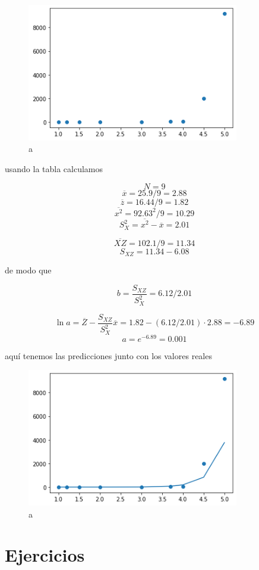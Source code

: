 \documentclass[]{book}
\theoremstyle{plain}
\theoremstyle{definition}
\begin{document}
\begin{figure}
\centering
\includegraphics[width=3.64583in,height=\textheight]{img/exponential_regression.png}
\caption{a}
\end{figure}

usando la tabla calculamos

\[N=9\] \[\overline{x} = 25.9/9 = 2.88\]
\[\overline{z} = 16.44/9 = 1.82\] \[\overline{x^2}=92.63^2/9 = 10.29\]
\[S^2_X=\overline{x^2} - \overline{x} = 2.01\]

\[\overline{XZ} = 102.1/9 = 11.34\] \[S_{XZ}=11.34 - 6.08\]

de modo que

\[b = \frac{S_{XZ}}{S^2_X} = 6.12/2.01 \]

\[\ln a = \overline{Z} - \frac{S_{XZ}}{S^2_X} \overline x = 1.82 - (6.12/2.01)\cdot 2.88 = -6.89\]
\[a = e^{ -6.89} = 0.001\]

aquí tenemos las predicciones junto con los valores reales

\begin{figure}
\centering
\includegraphics[width=3.64583in,height=\textheight]{img/exponential_regression3.png}
\caption{a}
\end{figure}

\hypertarget{ejercicios}{%
\section{Ejercicios}\label{ejercicios}}
\end{document}
